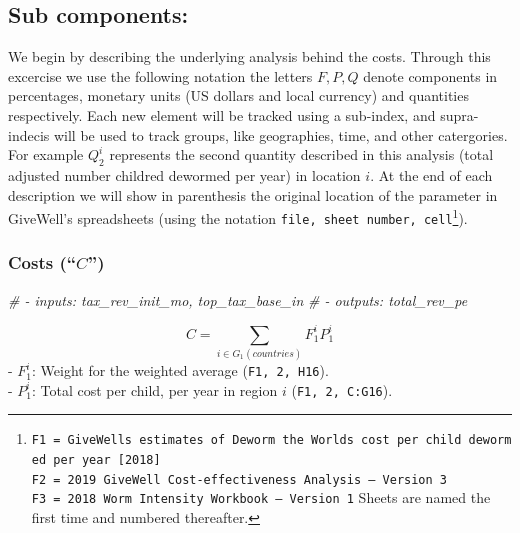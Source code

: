 \documentclass[]{article}
\newenvironment{Shaded}{\begin{snugshade}}{\end{snugshade}}
\newcommand{\CommentTok}[1]{\textcolor[rgb]{0.56,0.35,0.01}{\textit{#1}}}
\let\rmarkdownfootnote\footnote%
\def\footnote{\protect\rmarkdownfootnote}
\begin{document}
\hypertarget{sub-components}{%
\subsection{Sub components:}\label{sub-components}}

We begin by describing the underlying analysis behind the costs. Through
this excercise we use the following notation the letters \(F, P, Q\)
denote components in percentages, monetary units (US dollars and local
currency) and quantities respectively. Each new element will be tracked
using a sub-index, and supra-indecis will be used to track groups, like
geographies, time, and other catergories. For example \(Q^{i}_{2}\)
represents the second quantity described in this analysis (total
adjusted number childred dewormed per year) in location \(i\). At the
end of each description we will show in parenthesis the original
location of the parameter in GiveWell's spreadsheets (using the notation
\texttt{file,\ sheet\ number,\ cell}\footnote{\texttt{F1\ =\ GiveWell\textquotesingle{}s\ estimates\ of\ Deworm\ the\ World\textquotesingle{}s\ cost\ per\ child\ dewormed\ per\ year\ {[}2018{]}}~\\
  \texttt{F2\ =\ 2019\ GiveWell\ Cost-effectiveness\ Analysis\ —\ Version\ 3}~\\
  \texttt{F3\ =\ 2018\ Worm\ Intensity\ Workbook\ —\ Version\ 1} Sheets
  are named the first time and numbered thereafter.}).

\hypertarget{costs-c}{%
\subsubsection{\texorpdfstring{Costs
(``\(C\)'')}{Costs (``C'')}}\label{costs-c}}

\begin{Shaded}
\begin{Highlighting}[]
\CommentTok{# - inputs: tax_rev_init_mo, top_tax_base_in}
\CommentTok{# - outputs: total_rev_pe}
\end{Highlighting}
\end{Shaded}

\[
\begin{equation}
C = \sum_{i \in G_{1} (countries) } F^{i}_{1} P^{i}_{1}
\label{eq:2}
\tag{2}
\end{equation}
\] - \(F^{i}_{1}\): Weight for the weighted average
(\texttt{F1,\ 2,\ H16}).\\
- \(P^{i}_{1}\): Total cost per child, per year in region \(i\)
(\texttt{F1,\ 2,\ C:G16}).
\end{document}
